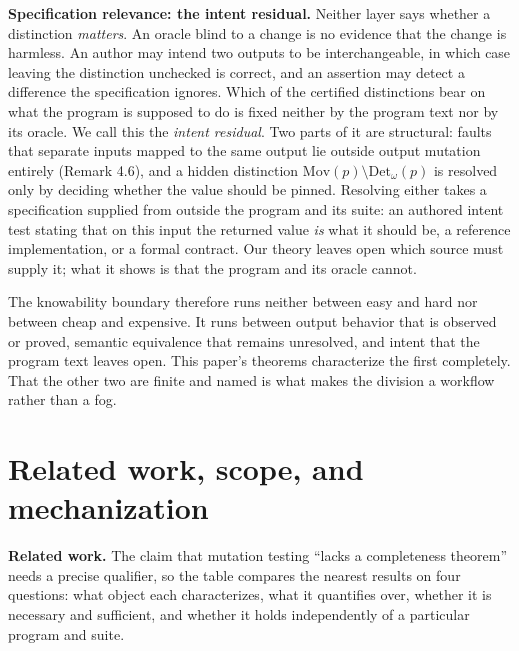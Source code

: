 \documentclass[conference]{IEEEtran}
\newcommand{\Mov}{\mathrm{Mov}}
\newcommand{\Det}{\mathrm{Det}}
\theoremstyle{run}
\begin{document}
\textbf{Specification relevance: the intent residual.} Neither layer says whether a distinction \emph{matters}. An oracle blind to a change is no evidence that the change is harmless. An author may intend two outputs to be interchangeable, in which case leaving the distinction unchecked is correct, and an assertion may detect a difference the specification ignores. Which of the certified distinctions bear on what the program is supposed to do is fixed neither by the program text nor by its oracle. We call this the \emph{intent residual}. Two parts of it are structural: faults that separate inputs mapped to the same output lie outside output mutation entirely (Remark 4.6), and a hidden distinction $\Mov(p) \setminus \Det_\omega(p)$ is resolved only by deciding whether the value should be pinned. Resolving either takes a specification supplied from outside the program and its suite: an authored intent test stating that on this input the returned value \emph{is} what it should be, a reference implementation, or a formal contract. Our theory leaves open which source must supply it; what it shows is that the program and its oracle cannot.

The knowability boundary therefore runs neither between easy and hard nor between cheap and expensive. It runs between output behavior that is observed or proved, semantic equivalence that remains unresolved, and intent that the program text leaves open. This paper's theorems characterize the first completely. That the other two are finite and named is what makes the division a workflow rather than a fog.

\setcounter{section}{10}
\section{Related work, scope, and mechanization}
\textbf{Related work.} The claim that mutation testing ``lacks a completeness theorem'' needs a precise qualifier, so the table compares the nearest results on four questions: what object each characterizes, what it quantifies over, whether it is necessary and sufficient, and whether it holds independently of a particular program and suite.
\end{document}
